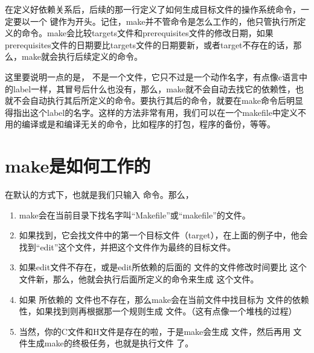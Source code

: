 \documentclass[a4paper,10pt]{sphinxmanual}
\begin{document}
在定义好依赖关系后，后续的那一行定义了如何生成目标文件的操作系统命令，一定要以一个  键作为开头。记住，make并不管命令是怎么工作的，他只管执行所定义的命令。make会比较targets文件和prerequisites文件的修改日期，如果prerequisites文件的日期要比targets文件的日期要新，或者target不存在的话，那么，make就会执行后续定义的命令。

这里要说明一点的是，  不是一个文件，它只不过是一个动作名字，有点像c语言中的label一样，其冒号后什么也没有，那么，make就不会自动去找它的依赖性，也就不会自动执行其后所定义的命令。要执行其后的命令，就要在make命令后明显得指出这个label的名字。这样的方法非常有用，我们可以在一个makefile中定义不用的编译或是和编译无关的命令，比如程序的打包，程序的备份，等等。


\section{make是如何工作的}
\label{\detokenize{introduction:make}}
在默认的方式下，也就是我们只输入  命令。那么，
\begin{enumerate}
\def\theenumi{\arabic{enumi}}
\def\labelenumi{\theenumi .}
\makeatletter\def\p@enumii{\p@enumi \theenumi .}\makeatother
\item {} 
make会在当前目录下找名字叫“Makefile”或“makefile”的文件。

\item {} 
如果找到，它会找文件中的第一个目标文件（target），在上面的例子中，他会找到“edit”这个文件，并把这个文件作为最终的目标文件。

\item {} 
如果edit文件不存在，或是edit所依赖的后面的  文件的文件修改时间要比  这个文件新，那么，他就会执行后面所定义的命令来生成  这个文件。

\item {} 
如果  所依赖的  文件也不存在，那么make会在当前文件中找目标为  文件的依赖性，如果找到则再根据那一个规则生成  文件。（这有点像一个堆栈的过程）

\item {} 
当然，你的C文件和H文件是存在的啦，于是make会生成  文件，然后再用  文件生成make的终极任务，也就是执行文件  了。

\end{enumerate}
\end{document}

